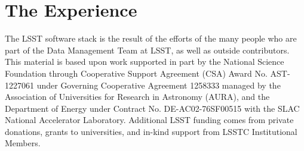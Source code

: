 \documentclass[11pt,twoside]{article}
\begin{document}
\section{The Experience}




\acknowledgements The LSST software stack
is the result of the efforts of the many people who are part of the
Data Management Team at LSST, as well as outside contributors.  This
material is based upon work supported in part by the National Science
Foundation through Cooperative Support Agreement (CSA) Award
No. AST-1227061 under Governing Cooperative Agreement 1258333 managed
by the Association of Universities for Research in Astronomy (AURA),
and the Department of Energy under Contract No. DE-AC02-76SF00515 with
the SLAC National Accelerator Laboratory.  Additional LSST funding
comes from private donations, grants to universities, and in-kind
support from LSSTC Institutional Members.

\end{document}
